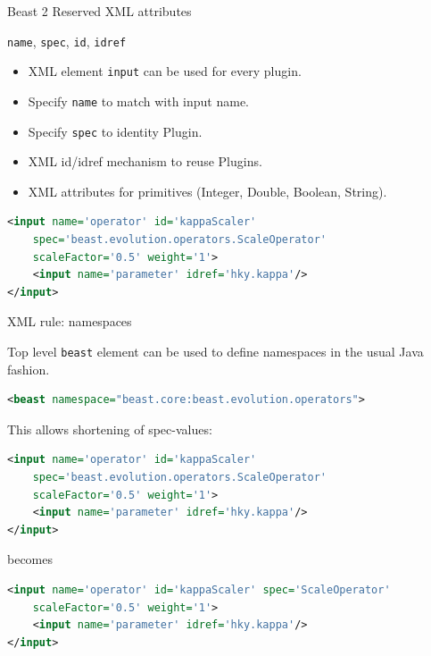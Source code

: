 \documentclass{beamer}
\theoremstyle{definition}
\begin{document}
\begin{frame}[containsverbatim]{Beast 2 Reserved XML attributes}

{\tt name}, {\tt spec}, {\tt id}, {\tt idref}
\begin{itemize}
\item XML element {\tt input} can be used for every plugin.
\item Specify {\tt name} to match with input name.
\item Specify {\tt spec} to identity Plugin.
\item XML id/idref mechanism to reuse Plugins.
\item XML attributes for primitives (Integer, Double, Boolean, String).
\end{itemize}

{\small
\begin{lstlisting}[language=XML]
<input name='operator' id='kappaScaler' 
    spec='beast.evolution.operators.ScaleOperator' 
    scaleFactor='0.5' weight='1'>
    <input name='parameter' idref='hky.kappa'/>
</input>
\end{lstlisting}
}
\end{frame}

\begin{frame}[containsverbatim]{XML rule: namespaces}


Top level {\tt beast} element can be used to define namespaces
in the usual Java fashion.

\begin{lstlisting}[language=XML]
    <beast namespace="beast.core:beast.evolution.operators">
\end{lstlisting}

This allows shortening of spec-values:

{\small
\begin{lstlisting}[language=XML]
<input name='operator' id='kappaScaler' 
    spec='beast.evolution.operators.ScaleOperator' 
    scaleFactor='0.5' weight='1'>
    <input name='parameter' idref='hky.kappa'/>
</input>
\end{lstlisting}
}

becomes

{\small
\begin{lstlisting}[language=XML]
<input name='operator' id='kappaScaler' spec='ScaleOperator' 
    scaleFactor='0.5' weight='1'>
    <input name='parameter' idref='hky.kappa'/>
</input>
\end{lstlisting}
}
\end{frame}
\end{document}
